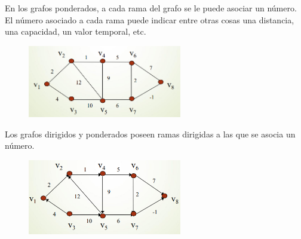 En los grafos ponderados, a cada rama del grafo se le puede asociar un número. El número asociado a cada rama puede indicar entre otras cosas una distancia, una capacidad, un valor temporal, etc.

\begin{figure}[h]
\centering
\includegraphics[width = 0.6\textwidth]{figs/grafo-ponderado.png}
\end{figure}

\newpage

Los grafos dirigidos y ponderados poseen ramas dirigidas a las que se asocia un número.

\begin{figure}[h]
\centering
\includegraphics[width = 0.6\textwidth]{figs/grafo-dirigido-ponderado.png}
\end{figure}